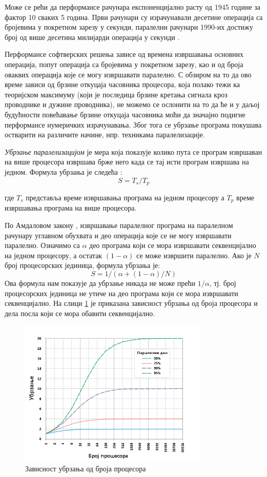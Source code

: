 \documentclass[12pt,oneside]{memoir}
\begin{document}
   Може се рећи да перформансе рачунара експоненцијално расту од 1945 године за фактор 10 сваких 5 година. Први рачунари су израчунавали десетине операција са бројевима у покретном зарезу у секунди, паралелни рачунари 1990-их достижу број од више десетина милијарди операција у секунди \cite{par_history}.
   
    Перформансе софтверских решења зависе од времена извршавања основних операција, попут операција са бројевима у покретном зарезу, као и од броја оваквих операција које се могу извршавати паралелно. С обзиром на то да ово време зависи од брзине откуцаја часовника процесора, која полако тежи ка теоријском максимуму (који је последица брзине кретања сигнала кроз проводнике и дужине проводника), не можемо се ослонити на то да ће и у даљој будућности повећавање брзине откуцаја часовника 	моћи да значајно подигне перформансе нумеричких израчунавања. Због тога се убрзање програма покушава остварити на различите начине, нпр. техникама паралелизације. 
        
     \textit{Убрзање паралелизацијом} је мера која показује колико пута се програм извршаван на више процесора извршава брже него када се тај исти програм извршава на једном. Формула убрзања је следећа \cite{par_various}:
 	$$ S = T_s/T_p $$
 	
\noindent где $ T_s $ представља време извршавања програма на једном процесору а $ T_p $ време извршавања програма на више процесора. 

 По Амдаловом закону \cite{par_various}, извршавање паралелног програма на паралелном рачунару углавном обухвата и део операција које се не могу извршавати паралелно. Означимо са $ \alpha $ део програма који се мора извршавати секвенцијално на једном процесору, а остатак $ (1 - \alpha)$ се може извршити паралелно. Ако је $ N $ број процесорских јединица, формула убрзања је: 
 	$$ S = 1 / ( \alpha + (1-\alpha)/N)$$
Ова формула нам показује да убрзање никада не може прећи $ 1/\alpha $, тј. број процесорских јединица не утиче на део програма који се мора извршавати секвенцијално. На слици \ref{fig:amdal} је приказана зависност убрзања од броја процесора и дела посла који се мора обавити секвенцијално.

 \begin{figure}[!ht]
  \centering
  \includegraphics[width=0.8\textwidth]{img/amdal.png}
  \caption{Зависност убрзања од броја процесора}
  \label{fig:amdal}
\end{figure}
\end{document}
